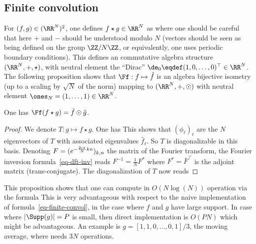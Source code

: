 \subsection{Finite convolution}

For $(f,g) \in (\RR^{N})^2$, one defines $f\star g \in \RR^N$ as
where one should be careful that here $+$ and $-$ should be understood modulo $N$ (vectors should be seen as being defined on the group $\ZZ/N\ZZ$, or equivalently, one uses periodic boundary conditions).
%
This defines an commutative algebra structure $(\RR^N,+,\star)$, with neutral element the ``Dirac'' $\de_0 \eqdef (1,0,\ldots,0)^\top \in \RR^N$. The following proposition shows that $\Ff : f \mapsto \hat f$ is an algebra bijective isometry (up to a scaling by $\sqrt{N}$ of the norm) mapping to $(\RR^N,+,\odot)$ with neutral element $\ones_N=(1,\ldots,1) \in \RR^N$.

\begin{prop}\label{prop-tfd-conv}
	One has $\Ff( f \star g ) = \hat f \odot \hat g$. 
\end{prop}
\begin{proof}
	We denote $T : g \mapsto f \star g$. One has 
	This shows that $(\phi_\ell)_\ell$ are the $N$ eigenvectors of $T$ with associated eigenvalues $\hat f_\ell$. So $T$ is diagonalizable in this basis. Denoting $F=(  e^{ -\frac{2\imath\pi}{N} k n } )_{k,n}$ the matrix of the Fourier transform, the Fourier inversion formula~\eqref{eq-dft-inv} reads $F^{-1} = \frac{1}{N}F^*$ where $F^*=\bar F^\top$ is the adjoint matrix (trans-conjugate). The diagonalization of $T$ now reads
\end{proof}

This proposition shows that one can compute in $O(N\log(N))$ operation via the formula
This is very advantageous with respect to the naive implementation of formula~\eqref{eq-finite-convol}, in the case where $f$ and $g$ have large support. In case where $|\Supp(g)|=P$ is small, then direct implementation is $O(PN)$ which might be advantageous. An example is $g=[1,1,0,\ldots,0,1]/3$, the moving average, where
needs $3N$ operations.

